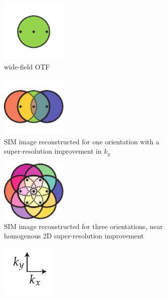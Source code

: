 \begin{figure}
    \centering
    \hfill
    \begin{subfigure}[t]{0.25\textwidth}
        \centering
        \includegraphics[height=3cm]{./sim/otf}
        \caption{\Gls{wide-field} \gls{OTF}}
        \label{fig:sim_otf}
    \end{subfigure}\hfill
    \begin{subfigure}[t]{0.25\textwidth}
        \centering
        \includegraphics[height=3cm]{./sim/third_flower}
        \caption{\gls{SIM} image reconstructed for one orientation with a \gls{super-resolution} improvement in $k_y$}
        \label{fig:sim_third_flower}
    \end{subfigure}\hfill
    \begin{subfigure}[t]{0.25\textwidth}
        \centering
        \includegraphics[height=3cm]{./sim/full_flower_alt}
        \caption{\gls{SIM} image reconstructed for three orientations, near homogenous 2D \gls{super-resolution} improvement}
        \label{fig:sim_full_flower}
    \end{subfigure}
    \begin{subfigure}[t]{0.1\textwidth}
        \centering
        \includegraphics{./sim/xy_coordinates}

\end{subfigure}
\end{figure}
